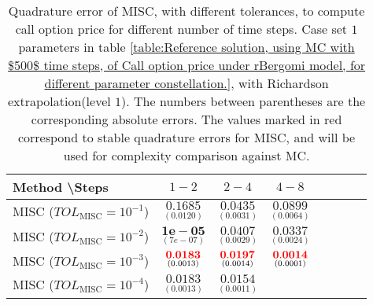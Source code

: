 \begin{table}[!h]
	\centering
	\begin{tabular}{l*{6}{c}r}
		Method \textbackslash  Steps            & $1-2$ & $2-4$ & $4-8$  \\
		\hline
		MISC ($TOL_{\text{MISC}}=10^{-1}$)  & $\underset{(  0.0120)}{\mathbf{   0.1685}}$ & $\underset{(0.0031)}{\mathbf{0.0435}}$ & $\underset{(0.0064)}{\mathbf{0.0899}}$  \\
		MISC ($TOL_{\text{MISC}}=10^{-2}$)  & $\underset{(7e-07)}{\mathbf{1e-05}}$ &    $\underset{(0.0029)}{\mathbf{0.0407}}$ & $\underset{(0.0024  )}{\mathbf{0.0337}}$  \\
		MISC ($TOL_{\text{MISC}}=10^{-3}$)  & $\underset{(0.0013)}{\mathbf{
				{\color{red}0.0183}}}$ &    $\underset{(0.0014
			)}{\mathbf{{\color{red}0.0197}}}$ & $\underset{(0.0001)}{\mathbf{ {\color{red}0.0014}
		}}$   \\
		
		MISC ($TOL_{\text{MISC}}=10^{-4}$)  & $\underset{(0.0013)}{\mathbf{
				0.0183}}$ &    $\underset{(0.0011
			
			)}{\mathbf{0.0154}}$   \\
		\hline
	\end{tabular}
	\caption{Quadrature error of MISC, with different tolerances,  to compute call option price  for different number of time steps. Case set $1$ parameters in table \ref{table:Reference solution, using MC with $500$ time steps, of Call option price under rBergomi model, for different parameter constellation.}, with Richardson extrapolation(level $1$). The numbers between parentheses are the corresponding absolute errors. The values marked in red correspond to stable quadrature errors for MISC, and will be used for complexity comparison against MC.}
	\label{Quadrature error of MISC to compute Call option price of the different tolerances for different number of time steps. Case set $1$ parameters, with Richardson extrapolation(level $1$). The numbers between parentheses are the corresponding absolute errors.}
\end{table}





